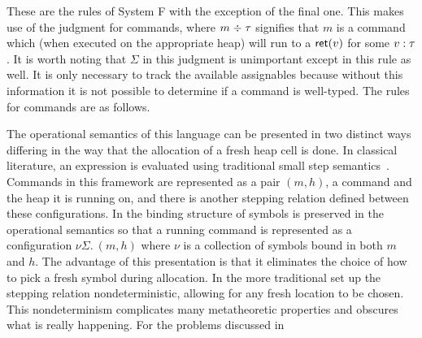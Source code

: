These are the rules of System F with the exception of the final
one. This makes use of the judgment for commands, where
$m \mathrel{\div} \tau$ signifies that $m$ is a command which (when executed
on the appropriate heap) will run to a $\mathsf{ret}(v)$ for some
$v \mathrel{:} \tau$. It is worth noting that $\Sigma$ in this judgment is
unimportant except in this rule as well. It is only necessary to track
the available assignables because without this information it is not
possible to determine if a command is well-typed. The rules for
commands are as follows.
The operational semantics of this language can be presented in two
distinct ways differing in the way that the allocation of a fresh heap
cell is done. In classical literature, an expression is evaluated
using traditional small step
semantics~\citep{TODO-SMALL-STEP}. Commands in this framework are
represented as a pair $(m, h)$, a command and the heap it is running
on, and there is another stepping relation defined between these
configurations. In \citet{TODO-PFPL} the binding structure of symbols is
preserved in the operational semantics so that a running command is
represented as a configuration $\nu \Sigma.\ (m, h)$ where $\nu$ is a
collection of symbols bound in both $m$ and $h$. The advantage of this
presentation is that it eliminates the choice of how to pick a fresh
symbol during allocation. In the more traditional set up the stepping
relation nondeterministic, allowing for any fresh location to be
chosen. This nondeterminism complicates many metatheoretic properties
and obscures what is really happening. For the problems discussed in
